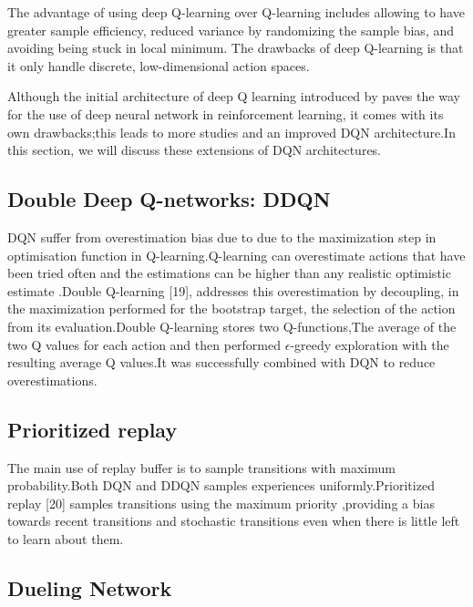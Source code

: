 The advantage of using deep Q-learning over Q-learning  
includes allowing  to have greater sample efficiency,
reduced variance by randomizing the sample bias, and avoiding being 
stuck in local minimum. 
The drawbacks of deep Q-learning is that it only handle discrete, 
low-dimensional action spaces.



Although the initial architecture of deep Q learning introduced by
\cite{mnih2013atari} paves the way for the use of deep neural network in
reinforcement learning, it comes with its own drawbacks;this leads to more
studies and an improved DQN architecture.In this section, we will discuss these
extensions of DQN architectures.

\subsection{Double Deep Q-networks: DDQN}

DQN suffer from overestimation bias due to due to the maximization step in optimisation function in Q-learning.Q-learning can overestimate actions that have been tried often and the estimations can be higher than any realistic optimistic estimate .Double Q-learning [19], addresses this overestimation by decoupling, in the maximization performed for the bootstrap target, the selection of the action from its evaluation.Double Q-learning stores two Q-functions,The average of the two Q values for each action and then performed $\mathcal{\epsilon}$-greedy exploration with the resulting average Q values.It was successfully combined with DQN to reduce  overestimations.

\subsection{Prioritized replay}

The main use of replay buffer is to sample transitions with maximum probability.Both DQN and DDQN samples experiences uniformly.Prioritized replay [20] samples transitions using the maximum priority ,providing a bias towards recent transitions and stochastic transitions  even when there is little left to learn about them.

\subsection{Dueling Network}

